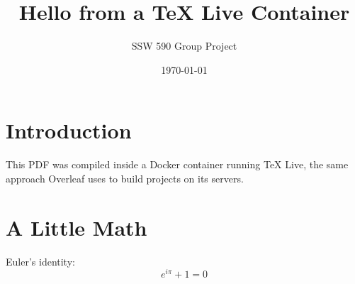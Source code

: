 \documentclass[11pt]{article}
\title{Hello from a TeX Live Container}
\author{SSW 590 Group Project}
\date{\today}
\begin{document}
\maketitle

\section{Introduction}
This PDF was compiled inside a Docker container running TeX Live, the same
approach Overleaf uses to build projects on its servers.

\section{A Little Math}
Euler's identity:
\begin{equation}
  e^{i\pi} + 1 = 0
\end{equation}
\end{document}
